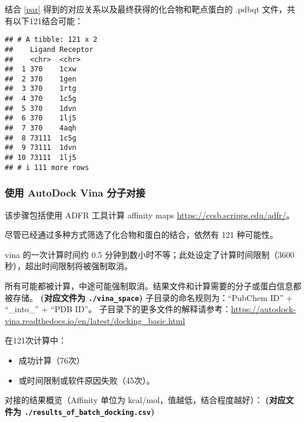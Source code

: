 \documentclass[
]{article}
\providecommand{\tightlist}{%
  \setlength{\itemsep}{0pt}\setlength{\parskip}{0pt}}
\begin{document}
结合 \ref{par} 得到的对应关系以及最终获得的化合物和靶点蛋白的 .pdbqt 文件，共有以下121结合可能：

\begin{verbatim}
## # A tibble: 121 x 2
##    Ligand Receptor
##    <chr>  <chr>   
##  1 370    1cxw    
##  2 370    1gen    
##  3 370    1rtg    
##  4 370    1c5g    
##  5 370    1dvn    
##  6 370    1lj5    
##  7 370    4aqh    
##  8 73111  1c5g    
##  9 73111  1dvn    
## 10 73111  1lj5    
## # i 111 more rows
\end{verbatim}

\hypertarget{ux4f7fux7528-autodock-vina-ux5206ux5b50ux5bf9ux63a5}{%
\subsubsection{使用 AutoDock Vina 分子对接}\label{ux4f7fux7528-autodock-vina-ux5206ux5b50ux5bf9ux63a5}}

该步骤包括使用 ADFR 工具计算 affinity maps \url{https://ccsb.scripps.edu/adfr/}。

尽管已经通过多种方式筛选了化合物和蛋白的结合，依然有 121 种可能性。

vina 的一次计算时间约 0.5 分钟到数小时不等；此处设定了计算时间限制（3600 秒），超出时间限制将被强制取消。

所有可能都被计算，中途可能强制取消。结果文件和计算需要的分子或蛋白信息都被存储。
\textbf{(对应文件为 \texttt{./vina\_space})}
子目录的命名规则为：``PubChem ID'' + ``\_into\_'' + ``PDB ID''。
子目录下的更多文件的解释请参考：\url{https://autodock-vina.readthedocs.io/en/latest/docking_basic.html}

在121次计算中：

\begin{itemize}
\tightlist
\item
  成功计算（76次）
\item
  或时间限制或软件原因失败（45次）。
\end{itemize}

对接的结果概览（Affinity 单位为 kcal/mol，值越低，结合程度越好）：
\textbf{(对应文件为 \texttt{./results\_of\_batch\_docking.csv})}
\end{document}
